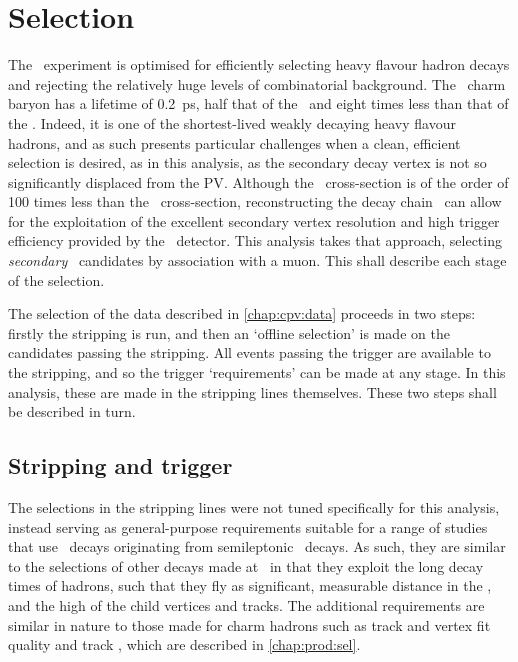 \chapter{Selection}
\label{chap:cpv:selection}

The \lhcb\ experiment is optimised for efficiently selecting heavy flavour 
hadron decays and rejecting the relatively huge levels of combinatorial 
background.
The \PLambdac\ charm baryon has a lifetime of \SI{0.2}{\pico\second}, half that 
of the \PDzero\ and eight times less than that of the \PBzero.
Indeed, it is one of the shortest-lived weakly decaying heavy flavour hadrons, 
and as such presents particular challenges when a clean, efficient selection is 
desired, as in this analysis, as the secondary decay vertex is not so 
significantly displaced from the \ac{PV}.
Although the \bbbar\ cross-section is of the order of 100 times less than the 
\ccbar\ cross-section, reconstructing the decay chain \LbToLcmuX\ can allow for 
the exploitation of the excellent secondary vertex resolution and high \PB 
trigger efficiency provided by the \lhcb\ detector.
This analysis takes that approach, selecting \emph{secondary} \PLambdac\ 
candidates by association with a muon.
This  shall describe each stage of the selection.

The selection of the data described in \cref{chap:cpv:data} proceeds in two 
steps: firstly the stripping is run, and then an `offline selection' is made on 
the candidates passing the stripping.
All events passing the trigger are available to the stripping, and so the 
trigger `requirements' can be made at any stage.
In this analysis, these are made in the stripping lines themselves.
These two steps shall be described in turn.

\section{Stripping and trigger}
\label{chap:cpv:selection:stripping_trigger}

The selections in the stripping lines were not tuned specifically for this 
analysis, instead serving as general-purpose requirements suitable for a range 
of studies that use \LcTophh\ decays originating from semileptonic \PLambdab\ 
decays.
As such, they are similar to the selections of other \PB decays made at \lhcb\ 
in that they exploit the long decay times of \PB hadrons, such that they fly as 
significant, measurable distance in the \velo, and the high \pT of the child 
vertices and tracks.
The additional requirements are similar in nature to those made for charm 
hadrons such as track and vertex fit quality and track \ipchisq, which are 
described in \cref{chap:prod:sel}.

